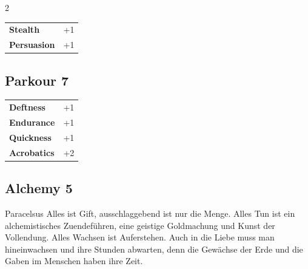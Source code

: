 \begin{multicols}{2}
\begin{tcolorbox}
\begin{tabular}{@{}ll@{}}
    \textbf{Stealth} & +1\\
    \textbf{Persuasion} & +1\\
\end{tabular}


\end{tcolorbox}

\begin{tcolorbox}
    \subsection*{Parkour \hfill \small{7 }}
    \tcblower




\begin{tabular}{@{}ll@{}}
    \textbf{Deftness} & +1\\
    \textbf{Endurance} & +1\\
    \textbf{Quickness} & +1\\
    \textbf{Acrobatics} & +2\\
\end{tabular}


\end{tcolorbox}

\begin{tcolorbox}
    \subsection*{Alchemy \hfill \small{5 }}
    \tcblower


\begin{pquote}{Paracelsus}
Alles ist Gift, ausschlaggebend ist nur die Menge. Alles Tun ist ein alchemistisches Zuendeführen, eine geistige Goldmachung und Kunst der Vollendung. Alles Wachsen ist Auferstehen. Auch in die Liebe muss man hineinwachsen und ihre Stunden abwarten, denn die Gewächse der Erde und die Gaben im Menschen haben ihre Zeit.
\end{pquote}

\vspace{3mm}


\end{tcolorbox}
\end{multicols}
